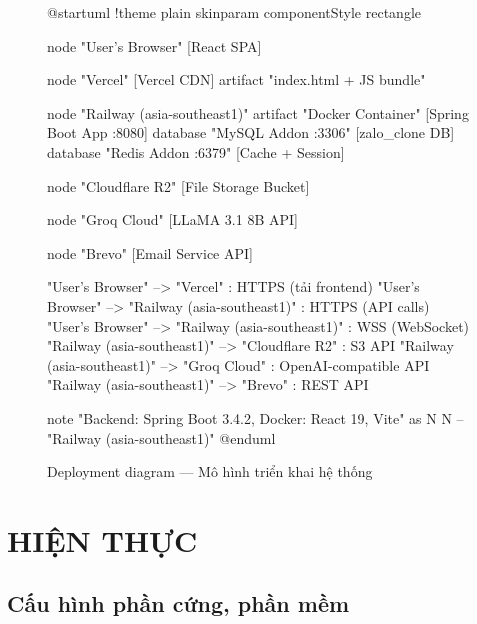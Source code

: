 \documentclass[12pt,a4paper]{report}
\begin{document}
\begin{figure}[H]
    \centering
    \begin{plantuml}
        @startuml
        !theme plain
        skinparam componentStyle rectangle

        node "User's Browser" {
            [React SPA]
        }

        node "Vercel" {
            [Vercel CDN]
            artifact "index.html + JS bundle"
        }

        node "Railway (asia-southeast1)" {
            artifact "Docker Container" {
                [Spring Boot App :8080]
            }
            database "MySQL Addon :3306" {
                [zalo\_clone DB]
            }
            database "Redis Addon :6379" {
                [Cache + Session]
            }
        }

        node "Cloudflare R2" {
            [File Storage Bucket]
        }

        node "Groq Cloud" {
            [LLaMA 3.1 8B API]
        }

        node "Brevo" {
            [Email Service API]
        }

        "User's Browser" --> "Vercel" : HTTPS (tải frontend)
        "User's Browser" --> "Railway (asia-southeast1)" : HTTPS (API calls)
        "User's Browser" --> "Railway (asia-southeast1)" : WSS (WebSocket)
        "Railway (asia-southeast1)" --> "Cloudflare R2" : S3 API
        "Railway (asia-southeast1)" --> "Groq Cloud" : OpenAI-compatible API
        "Railway (asia-southeast1)" --> "Brevo" : REST API

        note "Backend: Spring Boot 3.4.2, Docker\nFrontend: React 19, Vite" as N
        N -- "Railway (asia-southeast1)"
        @enduml
    \end{plantuml}
    \caption{Deployment diagram --- Mô hình triển khai hệ thống}
\end{figure}

\chapter{HIỆN THỰC}

\section{Cấu hình phần cứng, phần mềm}
\end{document}
